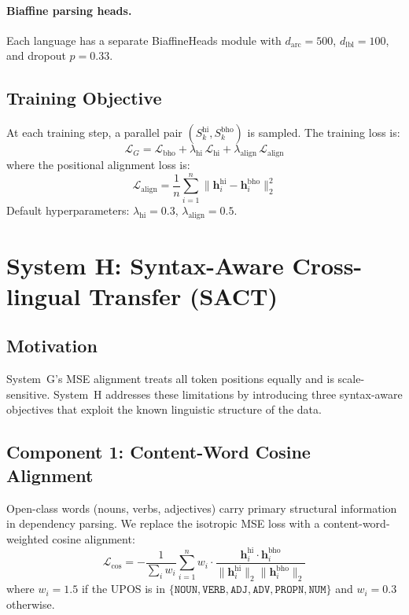 \documentclass[12pt,a4paper,oneside]{report}
\begin{document}
\paragraph{Biaffine parsing heads.}
Each language has a separate BiaffineHeads module with $d_{\text{arc}}=500$,
$d_{\text{lbl}}=100$, and dropout $p=0.33$.

\subsection{Training Objective}

At each training step, a parallel pair $(S^{\text{hi}}_k, S^{\text{bho}}_k)$ is
sampled. The training loss is:
\begin{equation}
  \mathcal{L}_G = \mathcal{L}_{\text{bho}} + \lambda_{\text{hi}}\,\mathcal{L}_{\text{hi}}
               + \lambda_{\text{align}}\,\mathcal{L}_{\text{align}}
  \label{eq:loss_g}
\end{equation}
where the positional alignment loss is:
\begin{equation}
  \mathcal{L}_{\text{align}} = \frac{1}{n}\sum_{i=1}^{n}
    \bigl\|\mathbf{h}^{\text{hi}}_i - \mathbf{h}^{\text{bho}}_i\bigr\|_2^2
  \label{eq:align_mse}
\end{equation}
Default hyperparameters: $\lambda_{\text{hi}}=0.3$, $\lambda_{\text{align}}=0.5$.

\section{System H: Syntax-Aware Cross-lingual Transfer (SACT)}
\label{sec:system_h}

\subsection{Motivation}

System~G's MSE alignment treats all token positions equally and is scale-sensitive.
System~H addresses these limitations by introducing three syntax-aware objectives
that exploit the known linguistic structure of the data.

\subsection{Component 1: Content-Word Cosine Alignment}
\label{sec:cosine_align}

Open-class words (nouns, verbs, adjectives) carry primary structural information in
dependency parsing. We replace the isotropic MSE loss with a content-word-weighted
cosine alignment:
\begin{equation}
  \mathcal{L}_{\text{cos}} = -\frac{1}{\sum_i w_i}\sum_{i=1}^{n}
    w_i \cdot \frac{\mathbf{h}^{\text{hi}}_i \cdot \mathbf{h}^{\text{bho}}_i}
                   {\|\mathbf{h}^{\text{hi}}_i\|_2 \|\mathbf{h}^{\text{bho}}_i\|_2}
  \label{eq:cosine_align}
\end{equation}
where $w_i = 1.5$ if the UPOS is in
$\{\texttt{NOUN}, \texttt{VERB}, \texttt{ADJ}, \texttt{ADV}, \texttt{PROPN}, \texttt{NUM}\}$
and $w_i = 0.3$ otherwise.
\end{document}
